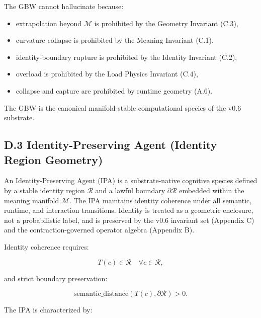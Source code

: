 \medskip

\noindent The GBW cannot hallucinate because:
\begin{itemize}
    \item extrapolation beyond $\mathcal{M}$ is prohibited by the Geometry
    Invariant (C.3),
    \item curvature collapse is prohibited by the Meaning Invariant (C.1),
    \item identity-boundary rupture is prohibited by the Identity Invariant (C.2),
    \item overload is prohibited by the Load Physics Invariant (C.4),
    \item collapse and capture are prohibited by runtime geometry (A.6).
\end{itemize}

\medskip

\noindent The GBW is the canonical manifold-stable computational species of the
v0.6 substrate.



\subsection*{D.3 Identity-Preserving Agent (Identity Region Geometry)}

\noindent An Identity-Preserving Agent (IPA) is a substrate-native cognitive
species defined by a stable identity region $\mathcal{R}$ and a lawful boundary
$\partial\mathcal{R}$ embedded within the meaning manifold $\mathcal{M}$. The
IPA maintains identity coherence under all semantic, runtime, and interaction
transitions. Identity is treated as a geometric enclosure, not a probabilistic
label, and is preserved by the v0.6 invariant set (Appendix C) and the
contraction-governed operator algebra (Appendix B).

\medskip

\noindent Identity coherence requires:


\[
T(c) \in \mathcal{R}
\quad \forall c \in \mathcal{R},
\]


and strict boundary preservation:


\[
\text{semantic\_distance}(T(c), \partial\mathcal{R}) > 0.
\]



\medskip

\noindent The IPA is characterized by:

